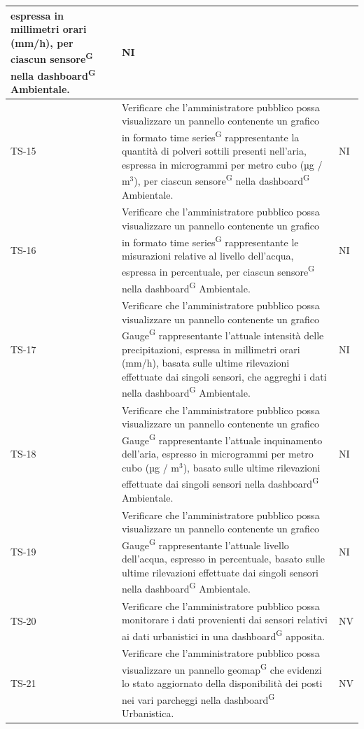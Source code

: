 \documentclass[8pt]{article}
\newcommand{\glossterm}[1]{#1\textsuperscript{G}} %
\begin{document}
\begin{longtable}{|>{\centering}p{2cm}|>{\RaggedRight}m{12cm}|>{\centering\arraybackslash}p{2cm}|}
    espressa in millimetri orari (mm/h), per ciascun \glossterm{sensore} nella \glossterm{dashboard} Ambientale.
    & NI \\
    \hline
    TS-15 & Verificare che l'amministratore pubblico possa visualizzare un pannello contenente
    un grafico in formato \glossterm{time series} rappresentante la quantità di polveri sottili presenti nell'aria,
    espressa in microgrammi per metro cubo (µg / $\mbox{m}^{\mbox{3}}$), per ciascun \glossterm{sensore} nella \glossterm{dashboard} Ambientale.
    & NI \\
    \hline
    TS-16 & Verificare che l'amministratore pubblico possa visualizzare un pannello contenente
    un grafico in formato \glossterm{time series} rappresentante le misurazioni relative al livello dell'acqua,
    espressa in percentuale, per ciascun \glossterm{sensore} nella \glossterm{dashboard} Ambientale.
    & NI \\
    \hline
    TS-17 & Verificare che l'amministratore pubblico possa visualizzare un pannello contenente
    un grafico \glossterm{Gauge} rappresentante l'attuale intensità delle precipitazioni,
    espressa in millimetri orari (mm/h), basata sulle ultime rilevazioni effettuate dai singoli sensori, che aggreghi i dati nella \glossterm{dashboard} Ambientale.
    & NI \\
    \hline
    TS-18 & Verificare che l'amministratore pubblico possa visualizzare un pannello contenente
    un grafico \glossterm{Gauge} rappresentante l'attuale inquinamento dell'aria,
    espresso in microgrammi per metro cubo (µg / $\mbox{m}^{\mbox{3}}$), basato sulle ultime rilevazioni effettuate dai singoli sensori nella \glossterm{dashboard} Ambientale.
    & NI \\
    \hline
    TS-19 & Verificare che l'amministratore pubblico possa visualizzare un pannello contenente
    un grafico \glossterm{Gauge} rappresentante l'attuale livello dell'acqua,
    espresso in percentuale, basato sulle ultime rilevazioni effettuate dai singoli sensori nella \glossterm{dashboard} Ambientale.
    & NI \\
    \hline
    TS-20 & Verificare che l'amministratore pubblico possa monitorare i dati provenienti
    dai sensori relativi ai dati urbanistici in una \glossterm{dashboard} apposita.
    & NV \\
    \hline
    TS-21 & Verificare che l'amministratore pubblico possa visualizzare un pannello \glossterm{geomap} che evidenzi lo stato aggiornato della disponibilità dei posti nei vari parcheggi nella
    \glossterm{dashboard} Urbanistica. & NV \\

\end{longtable}
\end{document}
